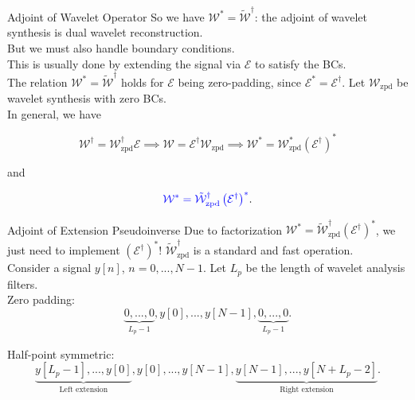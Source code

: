 \documentclass[xcolor=dvipsnames,t]{beamer} %
\begin{document}
\begin{frame}{Adjoint of Wavelet Operator}
   So we have $\mathcal{W}^\ast = \tilde{\mathcal{W}}^\dagger$: the adjoint of wavelet synthesis is dual wavelet reconstruction.\\

   But we must also handle boundary conditions.\\

   This is usually done by extending the signal via $\mathcal{E}$ to satisfy the BCs.\\

   The relation $\mathcal{W}^\ast = \tilde{\mathcal{W}}^\dagger$ holds for $\mathcal{E}$ being zero-padding, since $\mathcal{E}^\ast = \mathcal{E}^\dagger$.  Let $\mathcal{W}_\text{zpd}$ be wavelet synthesis with zero BCs.\\

   In general, we have

   \[ \mathcal{W}^\dagger = \mathcal{W}_\text{zpd}^\dagger\mathcal{E} \implies \mathcal{W}=\mathcal{E}^\dagger\mathcal{W}_\text{zpd} \implies \mathcal{W}^\ast = \mathcal{W}_\text{zpd}^\ast\left(\mathcal{E}^\dagger\right)^\ast \]

   and

   \[ {\color{blue} \mathcal{W}^\ast = \tilde{\mathcal{W}}_\text{zpd}^\dagger \left(\mathcal{E}^\dagger\right)^\ast}. \] 


\end{frame}

\begin{frame}{Adjoint of Extension Pseudoinverse}
   Due to factorization $\mathcal{W}^\ast = \tilde{\mathcal{W}}_\text{zpd}^\dagger(\mathcal{E}^\dagger)^\ast$, we just need to implement $(\mathcal{E}^\dagger)^\ast$!  $\tilde{\mathcal{W}}_\text{zpd}^\dagger$ is a standard and fast operation.\\[.5em]

   Consider a signal $y[n]$, $n=0,...,N-1$.  Let $L_p$ be the length of wavelet analysis filters.\\[.5em]

   Zero padding:
   \[ \underbrace{0, ..., 0}_{L_p-1}, y[0], ..., y[N-1], \underbrace{0, ..., 0}_{L_p-1}. \]

   Half-point symmetric:
   \[ \underbrace{y[L_p-1], ..., y[0]}_\text{Left extension}, y[0], ..., y[N-1], \underbrace{y[N-1], ..., y[N+L_p-2]}_\text{Right extension}. \] 

\end{frame}
\end{document}
